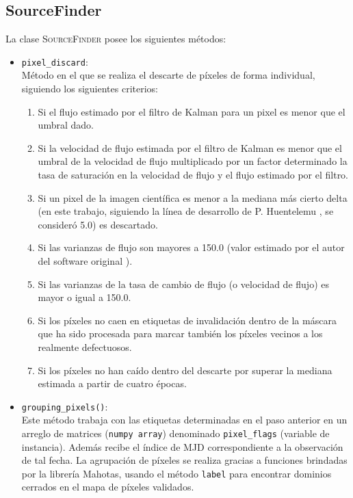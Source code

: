 \subsection{SourceFinder}
La clase \textsc{SourceFinder} posee los siguientes m\'etodos:
\begin{itemize}
\item \texttt{pixel\_discard}:\\
M\'etodo en el que se realiza el descarte de p\'ixeles de forma individual, siguiendo los siguientes criterios:
\begin{enumerate}
\item Si el flujo estimado por el filtro de Kalman para un pixel es menor que el umbral dado.
\item Si la velocidad de flujo estimada por el filtro de Kalman es menor que el umbral  de la velocidad de flujo multiplicado por un factor determinado la tasa de saturaci\'on en la velocidad de flujo y el flujo estimado por el filtro.
\item Si un pixel de la imagen cient\'ifica es menor a la mediana m\'as cierto delta (en este trabajo, siguiendo la l\'inea de desarrollo de P. Huentelemu \cite{huentelemu}, se consider\'o 5.0) es descartado.
\item Si las varianzas de flujo son mayores a 150.0 (valor estimado por el autor del software original \cite{huentelemu}).
\item Si las varianzas de la tasa de cambio de flujo (o velocidad de flujo) es mayor o igual a 150.0.
\item Si los p\'ixeles no caen en etiquetas de invalidaci\'on dentro de la m\'ascara que ha sido procesada para marcar tambi\'en los p\'ixeles vecinos a los realmente defectuosos.
\item Si los p\'ixeles no han ca\'ido dentro del descarte por superar la mediana estimada a partir de cuatro \'epocas. 
\end{enumerate}
\item \texttt{grouping\_pixels()}:\\
Este m\'etodo trabaja con las etiquetas determinadas en el paso anterior en un arreglo de matrices (\texttt{numpy array}) denominado \texttt{pixel\_flags} (variable de instancia). Adem\'as recibe el \'indice de MJD correspondiente a la observaci\'on de tal fecha.
La agrupaci\'on de p\'ixeles se realiza gracias a funciones brindadas por la librer\'ia \textsf{Mahotas}, usando el m\'etodo \texttt{label} para encontrar dominios cerrados en el mapa de p\'ixeles validados.
\bigskip


\end{itemize}
